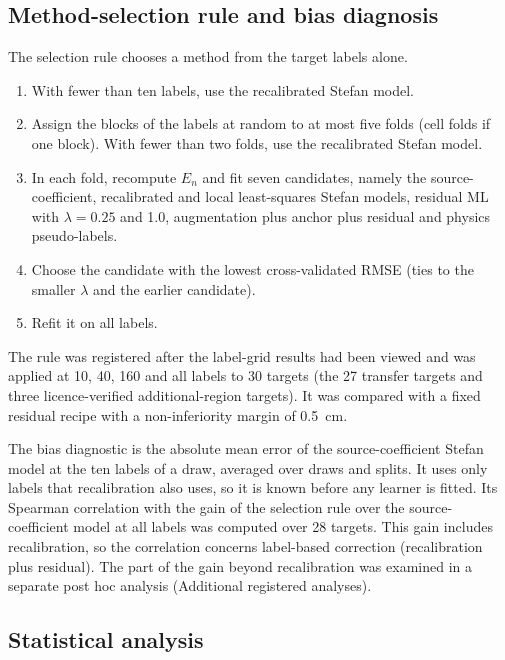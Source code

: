 \subsection{Method-selection rule and bias diagnosis}\label{sec:m-selection}

The selection rule chooses a method from the target labels alone.
\begin{enumerate}
\item With fewer than ten labels, use the recalibrated Stefan model.
\item Assign the blocks of the labels at random to at most five folds (cell folds if one block). With fewer than two folds, use the recalibrated Stefan model.
\item In each fold, recompute $E_n$ and fit seven candidates, namely the source-coefficient, recalibrated and local least-squares Stefan models, residual ML with $\lambda = 0.25$ and 1.0, augmentation plus anchor plus residual and physics pseudo-labels.
\item Choose the candidate with the lowest cross-validated RMSE (ties to the smaller $\lambda$ and the earlier candidate).
\item Refit it on all labels.
\end{enumerate}
The rule was registered after the label-grid results had been viewed and was applied at 10, 40, 160 and all labels to 30 targets (the 27 transfer targets and three licence-verified additional-region targets). It was compared with a fixed residual recipe with a non-inferiority margin of 0.5~cm.

The bias diagnostic is the absolute mean error of the source-coefficient Stefan model at the ten labels of a draw, averaged over draws and splits. It uses only labels that recalibration also uses, so it is known before any learner is fitted. Its Spearman correlation with the gain of the selection rule over the source-coefficient model at all labels was computed over 28 targets. This gain includes recalibration, so the correlation concerns label-based correction (recalibration plus residual). The part of the gain beyond recalibration was examined in a separate post hoc analysis (Additional registered analyses).

\subsection{Statistical analysis}\label{sec:m-stats}

